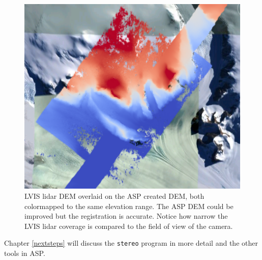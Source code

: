\begin{figure}[h!]
\centering
  \includegraphics[width=5.5in]{images/examples/pinhole/icebridge_dem_overlay.png}
\caption{LVIS lidar DEM overlaid on the ASP created DEM, both colormapped to the same elevation range.
The ASP DEM could be improved but the registration is accurate.  Notice how narrow the LVIS lidar coverage
is compared to the field of view of the camera.}
\label{fig:pinhole-icebridge-orbitviz}
\end{figure}

Chapter \ref{nextsteps} will discuss the \texttt{stereo} program in more
detail and the other tools in ASP.
